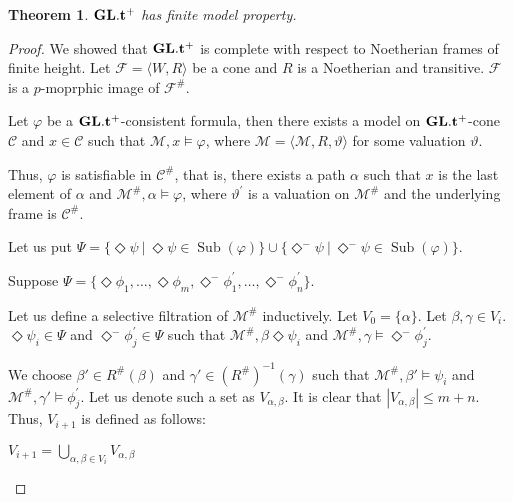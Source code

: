 \documentclass[a4paper]{article}
\theoremstyle{defin}
\theoremstyle{theorem}
\newtheorem{theorem}{Theorem}
\theoremstyle{prop}
\theoremstyle{lemma}
\theoremstyle{ex}
\theoremstyle{col}
\newcommand{\DiamondM}{\Diamond^{-}}
\begin{document}
\begin{theorem}
  ${\bf GL}.{\bf t}^{+}$ has finite model property.
\end{theorem}

\begin{proof}
  We showed that ${\bf GL}.{\bf t}^{+}$ is complete with respect to Noetherian frames of finite height. Let $\mathcal{F} = \langle W, R \rangle$ be a cone and $R$ is a Noetherian and transitive. $\mathcal{F}$ is a $p$-moprphic image of $\mathcal{F}^{\#}$.

Let $\varphi$ be a ${\bf GL}.{\bf t}^{+}$-consistent formula, then there exists a model on ${\bf GL}.{\bf t}^{+}$-cone $\mathcal{C}$ and $x \in \mathcal{C}$ such that $\mathcal{M}, x \models \varphi$, where $\mathcal{M} = \langle \mathcal{M}, R, \vartheta \rangle$ for some valuation $\vartheta$.

Thus, $\varphi$ is satisfiable in $\mathcal{C}^{\#}$, that is, there exists a path $\alpha$ such that $x$ is the last element of $\alpha$ and $\mathcal{M}^{\#}, \alpha \models \varphi$, where $\vartheta^{'}$ is a valuation on $\mathcal{M}^{\#}$ and the underlying frame is $\mathcal{C}^{\#}$.

Let us put $\Psi = \{ \Diamond \psi \: | \: \Diamond \psi \in \operatorname{Sub}(\varphi)\} \cup \{ \DiamondM \psi \: | \: \DiamondM \psi \in \operatorname{Sub}(\varphi)\}$.

Suppose $\Psi = \{ \Diamond \phi_1, \dots, \Diamond \phi_m, \DiamondM \phi^{'}_1, \dots, \DiamondM \phi^{'}_n \}$.

Let us define a selective filtration of $\mathcal{M}^{\#}$ inductively. Let $V_0 = \{ \alpha \}$. Let $\beta, \gamma \in V_i$. $\Diamond \psi_i \in \Psi$ and $\DiamondM \phi^{'}_j \in \Psi$ such that $\mathcal{M}^{\#}, \beta \Diamond \psi_i$ and $\mathcal{M}^{\#}, \gamma \models \DiamondM \phi^{'}_j$.

We choose $\beta' \in R^{\#}(\beta)$ and $\gamma' \in (R^{\#})^{-1}(\gamma)$ such that $\mathcal{M}^{\#}, \beta' \models \psi_i$ and
$\mathcal{M}^{\#}, \gamma' \models \phi^{'}_j$. Let us denote such a set as $V_{\alpha, \beta}$. It is clear that $|V_{\alpha, \beta}| \leq m + n$. Thus, $V_{i+1}$ is defined as follows:

\begin{center}
    $V_{i+1} = \bigcup \limits_{\alpha, \beta \in V_i} V_{\alpha, \beta}$
\end{center}
\end{proof}



\end{document}

